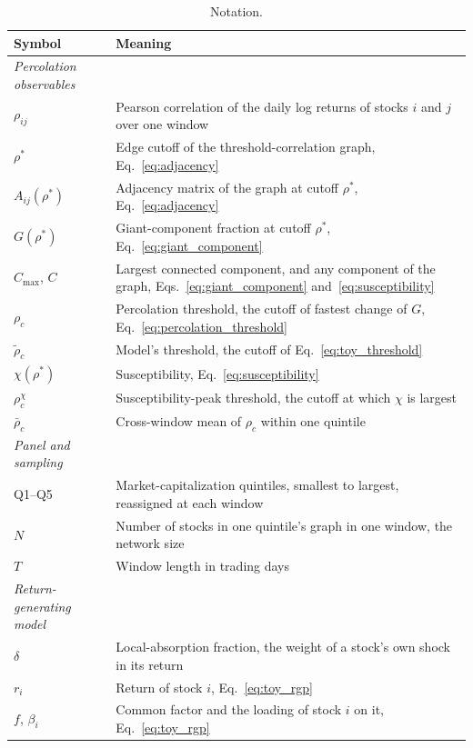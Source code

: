 \documentclass[a4paper,fleqn]{cas-sc}
\begin{document}
\begin{table}[pos=htbp]
\centering
\begin{threeparttable}
\caption{Notation.}\label{tab:notation}
\begin{tabular}{ll}
\toprule
Symbol & Meaning \\
\midrule
\textit{Percolation observables} & \\
$\rho_{ij}$        & Pearson correlation of the daily log returns of stocks $i$ and $j$ over one window \\
$\rho^*$           & Edge cutoff of the threshold-correlation graph, Eq.~\eqref{eq:adjacency} \\
$A_{ij}(\rho^*)$   & Adjacency matrix of the graph at cutoff $\rho^*$, Eq.~\eqref{eq:adjacency} \\
$G(\rho^*)$        & Giant-component fraction at cutoff $\rho^*$, Eq.~\eqref{eq:giant_component} \\
$C_{\max}$, $C$    & Largest connected component, and any component of the graph, Eqs.~\eqref{eq:giant_component} and~\eqref{eq:susceptibility} \\
$\rho_c$           & Percolation threshold, the cutoff of fastest change of $G$, Eq.~\eqref{eq:percolation_threshold} \\
$\tilde\rho_c$    & Model's threshold, the cutoff of Eq.~\eqref{eq:toy_threshold} \\
$\chi(\rho^*)$     & Susceptibility, Eq.~\eqref{eq:susceptibility} \\
$\rho_c^{\chi}$    & Susceptibility-peak threshold, the cutoff at which $\chi$ is largest \\
$\bar\rho_c$       & Cross-window mean of $\rho_c$ within one quintile \\
\midrule
\textit{Panel and sampling} & \\
Q1--Q5             & Market-capitalization quintiles, smallest to largest, reassigned at each window \\
$N$                & Number of stocks in one quintile's graph in one window, the network size \\
$T$                & Window length in trading days \\
\midrule
\textit{Return-generating model} & \\
$\delta$           & Local-absorption fraction, the weight of a stock's own shock in its return \\
$r_i$              & Return of stock $i$, Eq.~\eqref{eq:toy_rgp} \\
$f$, $\beta_i$     & Common factor and the loading of stock $i$ on it, Eq.~\eqref{eq:toy_rgp} \\

\end{tabular}
\end{threeparttable}
\end{table}
\end{document}

